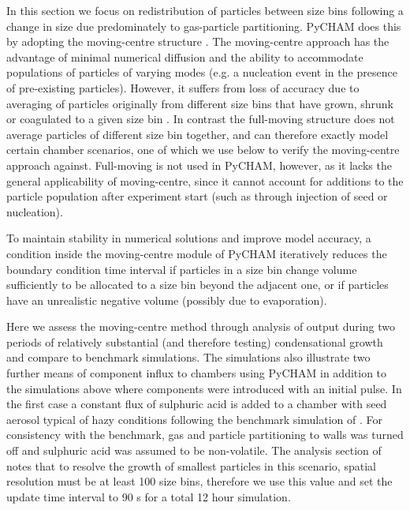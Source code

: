 \documentclass[gmd, manuscript]{copernicus}
\begin{document}
In this section we focus on redistribution of particles between size bins following a change in size due predominately to gas-particle partitioning.  PyCHAM does this by adopting the moving-centre structure \citep{Jacobson2005}.  The moving-centre approach has the advantage of minimal numerical diffusion and the ability to accommodate populations of particles of varying modes (e.g. a nucleation event in the presence of pre-existing particles).  However, it suffers from loss of accuracy due to averaging of particles originally from different size bins that have grown, shrunk or coagulated to a given size bin \citep{Zhang1999}.  In contrast the full-moving structure does not average particles of different size bin together, and can therefore exactly model certain chamber scenarios, one of which we use below to verify the moving-centre approach against.  Full-moving is not used in PyCHAM, however, as it lacks the general applicability of moving-centre, since it cannot account for additions to the particle population after experiment start (such as through injection of seed or nucleation).  

To maintain stability in numerical solutions and improve model accuracy, a condition inside the moving-centre module of PyCHAM iteratively reduces the boundary condition time interval if particles in a size bin change volume sufficiently to be allocated to a size bin beyond the adjacent one, or if particles have an unrealistic negative volume (possibly due to evaporation).

Here we assess the moving-centre method through analysis of output during two periods of relatively substantial (and therefore testing) condensational growth and compare to benchmark simulations.  The simulations also illustrate two further means of component influx to chambers using PyCHAM in addition to the simulations above where components were introduced with an initial pulse.  In the first case a constant flux of sulphuric acid is added to a chamber with seed aerosol typical of hazy conditions following the benchmark simulation of \citet{Zhang1999}.  For consistency with the benchmark, gas and particle partitioning to walls was turned off and sulphuric acid was assumed to be non-volatile.  The analysis section of \citet{Zhang1999} notes that to resolve the growth of smallest particles in this scenario, spatial resolution must be at least 100 size bins, therefore we use this value and set the update time interval to 90 s for a total 12 hour simulation.  
\end{document}
